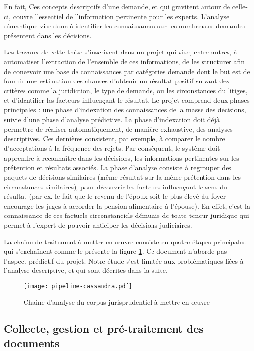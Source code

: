 En fait, Ces concepts descriptifs d'une demande, et qui gravitent autour de celle-ci, couvre l'essentiel de l'information pertinente pour les experts.  L'analyse sémantique vise donc à identifier les connaissances sur les nombreuses demandes présentent dans les décisions. 

Les travaux de cette thèse s'inscrivent dans un projet qui vise, entre autres, à automatiser l'extraction de l'ensemble de ces informations, de les structurer afin de concevoir une base de connaissances par catégories demande  dont le but est de fournir une estimation des chances d'obtenir un résultat positif suivant des critères comme la juridiction, le type de demande, ou les circonstances du litiges, et d'identifier les facteurs influençant le résultat. Le projet comprend deux phases principales : une phase d'indexation des connaissances de la masse des décisions, suivie d'une phase d'analyse prédictive. La phase d'indexation doit déjà permettre de réaliser automatiquement, de manière exhaustive, des analyses descriptives. Ces dernières consistent, par exemple, à comparer le nombre d'acceptations à la fréquence des rejets. Par conséquent, le système doit apprendre à reconnaître dans les décisions, les informations pertinentes sur les prétention et résultats associés. La phase d'analyse consiste à regrouper des paquets de décisions similaires (même résultat sur la même prétention dans les circonstances similaires), pour découvrir les facteurs influençant le sens du résultat (par ex. le fait que \og le revenu de l'époux soit le plus élevé du foyer\fg{} encourage les juges à accorder la pension alimentaire à l'épouse). En effet, c'est la connaissance de ces factuels circonstanciels démunis de toute teneur juridique qui permet à l'expert de pouvoir anticiper les décisions judiciaires.

 La chaîne de traitement à mettre en \oe uvre consiste en quatre étapes principales qui s'enchaînent comme le présente la figure \ref{fig:intro:pipeline-globale}. Ce document n'aborde pas l'aspect prédictif du projet. Notre étude s'est limitée aux problématiques liées à l'analyse descriptive, et qui sont décrites dans la suite.
\begin{figure}
	\texttt{[image: pipeline-cassandra.pdf]}
	\caption{Chaine d'analyse du corpus jurisprudentiel à mettre en \oe uvre} \label{fig:intro:pipeline-globale}
\end{figure} 


\subsection{Collecte, gestion et pré-traitement des documents}


